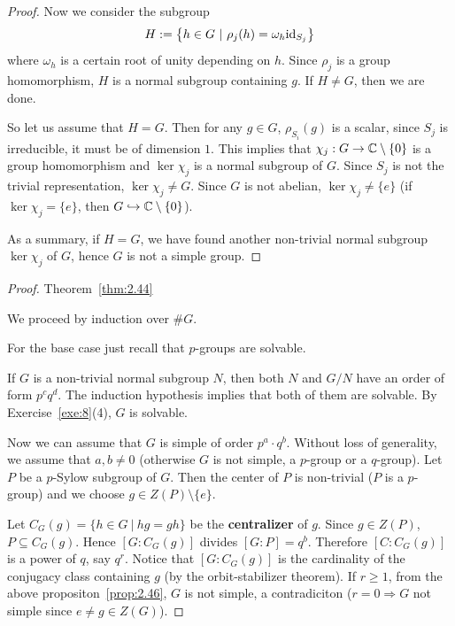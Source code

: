 \documentclass[twoside = false,	%
		headsepline,		%
		parskip = true,
		]{scrbook}						%
\begin{document}
\begin{proof}
        Now we consider the subgroup
        \begin{equation*}
            H:= \left\{ h \in G \ | \ \rho_j(h) = \omega_h \mathrm{id}_{S_j}\right\}
        \end{equation*}
        where $\omega_h$ is a certain root of unity depending on $h$. Since $\rho_j$ is a group homomorphism,
        $H$ is a normal subgroup containing $g$. If $H \neq G$, then we are done.

        So let us assume that $H=G$. Then for any $g \in G$, $\rho_{S_i}(g)$ is a scalar, since $S_j$ is irreducible, it must be of dimension $1$.
        This implies that $\chi_j: G \to \mathbb C \setminus \{0\}$ is a group homomorphism and $\ker \chi_j$ is a normal subgroup of $G$. Since $S_j$ is not the trivial representation, $\ker \chi_j \neq G$.
        Since $G$ is not abelian, $\ker \chi_j \neq \{e\}$ (if $\ker \chi_j = \{e\}$, then $G \hookrightarrow \mathbb C \setminus\{0\}$).

        As a summary, if $H=G$, we have found another non-trivial normal subgroup $\ker \chi_j$ of $G$, hence $G$ is not a simple group.
    \end{proof}

    \begin{proof} Theorem~\ref{thm:2.44}

        We proceed by induction over $\#G$.

        For the base case just recall that $p$-groups are solvable.

        If $G$ is a non-trivial normal subgroup $N$, then both $N$ and $G/N$ have an order of form $p^c q^d$. The induction hypothesis implies that both of them are solvable.
        By Exercise~\ref{exe:8}(4), $G$ is solvable.

        Now we can assume that $G$ is simple of order $p^a\cdot q^b$. Without loss of generality, we assume that $a,b \neq 0$ (otherwise $G$ is not simple, a $p$-group or a $q$-group).
        Let $P$ be a $p$-Sylow subgroup of $G$. Then the center of $P$ is non-trivial ($P$ is a $p$-group) and we choose $g \in Z(P) \setminus\{e\}$.

        Let $C_G(g) = \{h \in G \ | \ hg = gh\}$ be the \textbf{centralizer} of $g$. Since $g \in Z(P)$, $P \subseteq C_G(g)$.
        Hence $[G:C_G(g)]$ divides $[G:P] = q^b$. Therefore $[C:C_G(g)]$ is a power of $q$, say $q^r$. Notice that $[G:C_G(g)]$ is the cardinality of the conjugacy class containing $g$ (by the orbit-stabilizer theorem).
        If $r \geq 1$, from the above propositon~\ref{prop:2.46}, $G$ is not simple, a contradiciton ($r=0 \Rightarrow G$ not simple since $e \neq g \in Z(G)$).
    \end{proof}
\end{document}
